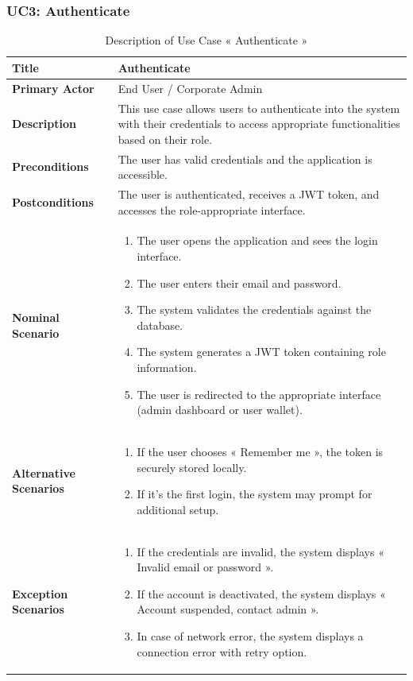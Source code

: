 \subsubsection{UC3: Authenticate}

\begin{longtable}{|p{4cm}|p{10cm}|}
      \caption{Description of Use Case « Authenticate »}
  \label{tab:uc_authenticate} \\
  \hline
  \textbf{Title} & Authenticate \\ \hline
  \textbf{Primary Actor} & End User / Corporate Admin \\ \hline
  \textbf{Description} & This use case allows users to authenticate into the system with their credentials to access appropriate functionalities based on their role. \\ \hline
  \textbf{Preconditions} & The user has valid credentials and the application is accessible. \\ \hline
\textbf{Postconditions} & The user is authenticated, receives a JWT token, and accesses the role-appropriate interface. \\ \hline
  \textbf{Nominal Scenario} &
    \begin{enumerate}[nosep,leftmargin=*]
      \item The user opens the application and sees the login interface.
      \item The user enters their email and password.
      \item The system validates the credentials against the database.
      \item The system generates a JWT token containing role information.
      \item The user is redirected to the appropriate interface (admin dashboard or user wallet).
    \end{enumerate} \\ \hline
  \textbf{Alternative Scenarios} &
    \begin{enumerate}[nosep,leftmargin=*]
      \item If the user chooses « Remember me », the token is securely stored locally.
      \item If it's the first login, the system may prompt for additional setup.
    \end{enumerate} \\ \hline
  \textbf{Exception Scenarios} &
    \begin{enumerate}[nosep,leftmargin=*]
      \item If the credentials are invalid, the system displays « Invalid email or password ».
      \item If the account is deactivated, the system displays « Account suspended, contact admin ».
      \item In case of network error, the system displays a connection error with retry option.
    \end{enumerate} \\ \hline
\end{longtable}

